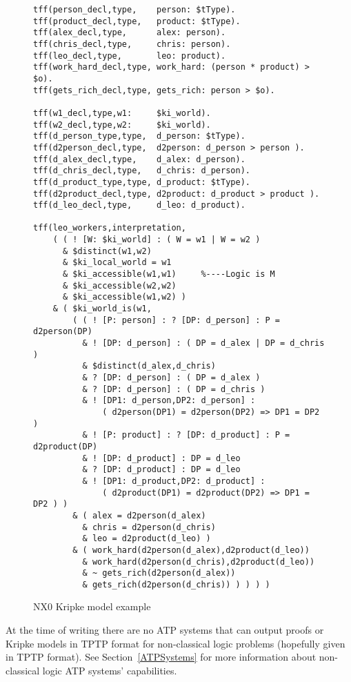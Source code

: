 \documentclass[runningheads]{llncs}
\begin{document}
\begin{figure}[htbp]
\small
{}
\begin{verbatim}
tff(person_decl,type,    person: $tType).
tff(product_decl,type,   product: $tType).
tff(alex_decl,type,      alex: person).
tff(chris_decl,type,     chris: person).
tff(leo_decl,type,       leo: product).
tff(work_hard_decl,type, work_hard: (person * product) > $o).
tff(gets_rich_decl,type, gets_rich: person > $o).

tff(w1_decl,type,w1:     $ki_world).
tff(w2_decl,type,w2:     $ki_world).
tff(d_person_type,type,  d_person: $tType).
tff(d2person_decl,type,  d2person: d_person > person ).
tff(d_alex_decl,type,    d_alex: d_person).
tff(d_chris_decl,type,   d_chris: d_person).
tff(d_product_type,type, d_product: $tType).
tff(d2product_decl,type, d2product: d_product > product ).
tff(d_leo_decl,type,     d_leo: d_product).

tff(leo_workers,interpretation,
    ( ( ! [W: $ki_world] : ( W = w1 | W = w2 )
      & $distinct(w1,w2)
      & $ki_local_world = w1
      & $ki_accessible(w1,w1)     %----Logic is M
      & $ki_accessible(w2,w2)
      & $ki_accessible(w1,w2) )
    & ( $ki_world_is(w1,
        ( ( ! [P: person] : ? [DP: d_person] : P = d2person(DP)
          & ! [DP: d_person] : ( DP = d_alex | DP = d_chris )
          & $distinct(d_alex,d_chris)
          & ? [DP: d_person] : ( DP = d_alex )
          & ? [DP: d_person] : ( DP = d_chris )
          & ! [DP1: d_person,DP2: d_person] : 
              ( d2person(DP1) = d2person(DP2) => DP1 = DP2 )
          & ! [P: product] : ? [DP: d_product] : P = d2product(DP)
          & ! [DP: d_product] : DP = d_leo
          & ? [DP: d_product] : DP = d_leo
          & ! [DP1: d_product,DP2: d_product] :
              ( d2product(DP1) = d2product(DP2) => DP1 = DP2 ) )
        & ( alex = d2person(d_alex)
          & chris = d2person(d_chris)
          & leo = d2product(d_leo) )
        & ( work_hard(d2person(d_alex),d2product(d_leo))
          & work_hard(d2person(d_chris),d2product(d_leo))
          & ~ gets_rich(d2person(d_alex))
          & gets_rich(d2person(d_chris)) ) ) ) )
\end{verbatim}
\caption{NX0 Kripke model example}
\label{NX0Kripke}
\end{figure}

At the time of writing there are no ATP systems that can output proofs or Kripke models
in TPTP format for non-classical logic problems (hopefully given in TPTP format).
See Section~\ref{ATPSystems} for more information about non-classical logic ATP systems' 
capabilities.
\end{document}
